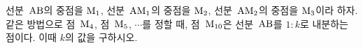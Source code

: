 선분~$\mathrm{AB}$의 중점을 $\mathrm{M}_1$, 선분~$\mathrm{AM}_1$의 중점을 $\mathrm{M}_2$, 선분~$\mathrm{AM}_2$의 중점을 $\mathrm{M}_3$이라 하자. 같은 방법으로 점~$\mathrm{M}_4$, 점~$\mathrm{M}_5$, $\cdots$를 정할 때, 점~$\mathrm{M}_{10}$은 선분~$\mathrm{AB}$를 $1:k$로 내분하는 점이다. 이때 $k$의 값을 구하시오.
